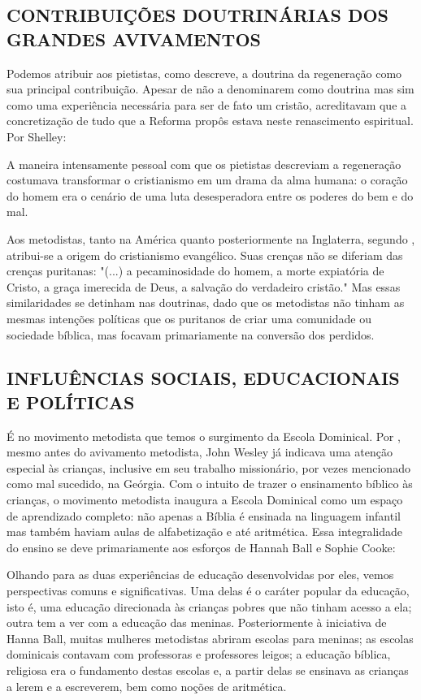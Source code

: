 \documentclass[
    article,            %
	12pt,				%
	oneside,			%
	a4paper,			%
	chapter=TITLE,		%
	section=TITLE,		%
	english,			%
	french,				%
	spanish,			%
	brazil				%
	]{abntex2}
\begin{document}
\subsection{CONTRIBUIÇÕES DOUTRINÁRIAS DOS GRANDES AVIVAMENTOS}
Podemos atribuir aos pietistas, como  descreve, a doutrina da regeneração como sua principal contribuição. Apesar de não a denominarem como doutrina mas sim como uma experiência necessária para ser de fato um cristão, acreditavam que a concretização de tudo que a Reforma propôs estava neste renascimento espiritual. Por Shelley:
\begin{citacao}
A maneira intensamente pessoal com que os pietistas descreviam a regeneração costumava transformar o cristianismo em um drama da alma humana: o coração do homem era o cenário de uma luta desesperadora entre os poderes do bem e do mal. \cite[p.218]{SHELLEY}
\end{citacao}

Aos metodistas, tanto na América quanto posteriormente na Inglaterra, segundo , atribui-se a origem do cristianismo evangélico. Suas crenças não se diferiam das crenças puritanas: "(...) a pecaminosidade do homem, a morte expiatória de Cristo, a graça imerecida de Deus, a salvação do verdadeiro cristão." \cite[p.219]{SHELLEY} Mas essas similaridades se detinham nas doutrinas, dado que os metodistas não tinham as mesmas intenções políticas que os puritanos de criar uma comunidade ou sociedade bíblica, mas focavam primariamente na conversão dos perdidos.

\subsection{INFLUÊNCIAS SOCIAIS, EDUCACIONAIS E POLÍTICAS}
É no movimento metodista que temos o surgimento da Escola Dominical. Por , mesmo antes do avivamento metodista, John Wesley já indicava uma atenção especial às crianças, inclusive em seu trabalho missionário, por vezes mencionado como mal sucedido, na Geórgia. Com o intuito de trazer o ensinamento bíblico às crianças, o movimento metodista inaugura a Escola Dominical como um espaço de aprendizado completo: não apenas a Bíblia é ensinada na linguagem infantil mas também haviam aulas de alfabetização e até aritmética. Essa integralidade do ensino se deve primariamente aos esforços de Hannah Ball e Sophie Cooke:
\begin{citacao}
Olhando para as duas experiências de educação desenvolvidas por eles, vemos perspectivas comuns e significativas. Uma delas é o caráter popular da educação, isto é, uma educação direcionada às crianças pobres que não tinham acesso a ela; outra tem a ver com a educação das meninas. Posteriormente à iniciativa de Hanna Ball, muitas mulheres metodistas abriram escolas para meninas; as escolas dominicais contavam com professoras e professores leigos; a educação bíblica, religiosa era o fundamento destas escolas e, a partir delas se ensinava as crianças a lerem e a escreverem, bem como noções de aritmética. \cite{FERNANDES}
\end{citacao}
\end{document}

